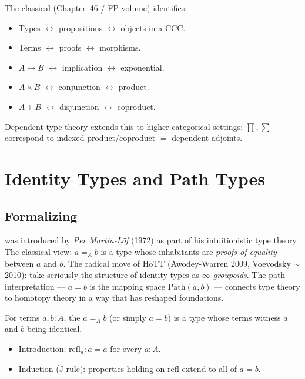 \begin{remark}
The classical  (Chapter~46 / FP
volume) identifies:
\begin{itemize}
  \item Types $\leftrightarrow$ propositions $\leftrightarrow$ objects
        in a CCC.
  \item Terms $\leftrightarrow$ proofs $\leftrightarrow$ morphisms.
  \item $A \to B$ $\leftrightarrow$ implication $\leftrightarrow$ exponential.
  \item $A \times B$ $\leftrightarrow$ conjunction $\leftrightarrow$ product.
  \item $A + B$ $\leftrightarrow$ disjunction $\leftrightarrow$ coproduct.
\end{itemize}
Dependent type theory extends this to higher-categorical settings:
$\prod, \sum$ correspond to indexed product/coproduct $=$ dependent
adjoints.
\end{remark}


\section{Identity Types and Path Types}
\label{sec:identity-types}

\subsection{Formalizing}

\begin{nameorigin}
 was introduced by \emph{Per Martin-Löf} (1972) as
part of his intuitionistic type theory. The classical view: $a =_A b$
is a type whose inhabitants are \emph{proofs of equality} between $a$
and $b$. The radical move of HoTT (Awodey-Warren 2009, Voevodsky $\sim$
2010): take seriously the structure of identity types as
\emph{$\infty$-groupoids}. The path interpretation — $a = b$ is the
mapping space $\mathrm{Path}(a, b)$ — connects type theory to homotopy
theory in a way that has reshaped foundations.
\end{nameorigin}

\begin{definition}
\label{def:identity-type}
For terms $a, b : A$, the  $a =_A b$ (or simply
$a = b$) is a type whose terms witness $a$ and $b$ being identical.
\begin{itemize}
  \item Introduction: $\mathrm{refl}_a : a = a$ for every $a : A$.
  \item Induction (J-rule): properties holding on $\mathrm{refl}$ extend
        to all of $a = b$.
\end{itemize}
\end{definition}

